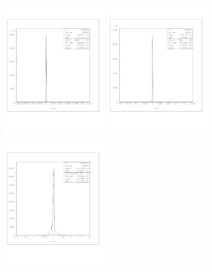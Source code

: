 \documentclass[a4paper]{article}
\begin{document}
\begin{figure}[!htb]
  \centering
  \includegraphics[width=0.49\textwidth]{ex_images/1_050_010_xs.jpg}
  \includegraphics[width=0.49\textwidth]{ex_images/1_050_030_xs.jpg}
  \includegraphics[width=0.49\textwidth]{ex_images/1_050_050_xs.jpg}

\end{figure}
\end{document}
